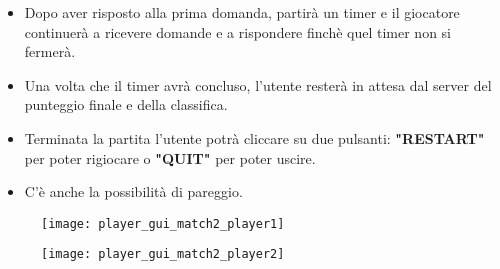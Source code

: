 \restoregeometry

\newpage


\begin{minipage}{.45\linewidth}
	\begin{itemize}
		\item \textsf{\normalsize Dopo aver risposto alla prima domanda, partirà un timer e il giocatore continuerà a ricevere domande e a rispondere finchè quel timer non si fermerà.}
		\item \textsf{\normalsize Una volta che il timer avrà concluso, l'utente resterà in attesa dal server del punteggio finale e della classifica.}
		\item \textsf{\normalsize Terminata la partita l'utente potrà cliccare su due pulsanti: \textbf{"RESTART"} per poter rigiocare o \textbf{"QUIT"} per poter uscire.}
		\item \textsf{\normalsize C'è anche la possibilità di pareggio.}
	\end{itemize}
\end{minipage}
\begin{minipage}{.55\linewidth} %
	\begin{minipage}{.45\linewidth}
		\begin{figure}[H]
			\texttt{[image: player\_gui\_match2\_player1]}
		\end{figure}
	\end{minipage}
	\hspace{0.05\linewidth}
	\begin{minipage}{.45\linewidth}
		\begin{figure}[H]
			\texttt{[image: player\_gui\_match2\_player2]}
		\end{figure}
	\end{minipage}
\end{minipage}

\restoregeometry

